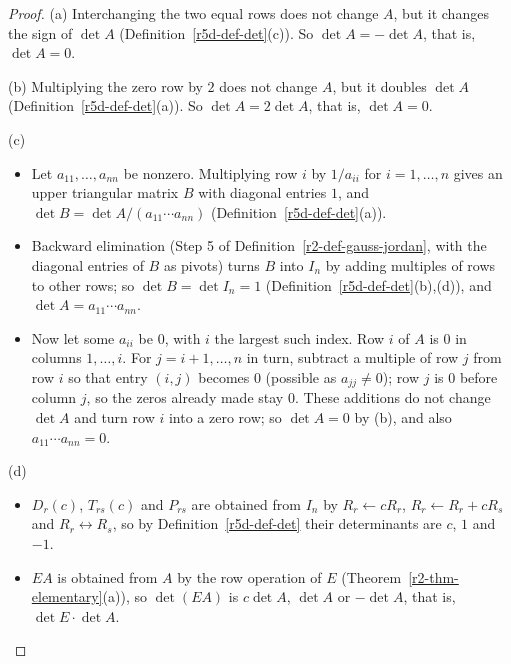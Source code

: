\documentclass[12pt]{article}
\theoremstyle{definition}
\begin{document}
\begin{proof}
(a) Interchanging the two equal rows does not change \(A\), but it changes the sign of \(\det A\)
(Definition~\ref{r5d-def-det}(c)). So \(\det A=-\det A\), that is, \(\det A=0\).

(b) Multiplying the zero row by \(2\) does not change \(A\), but it doubles \(\det A\)
(Definition~\ref{r5d-def-det}(a)). So \(\det A=2\det A\), that is, \(\det A=0\).

(c)
\begin{itemize}
\item Let \(a_{11},\dots,a_{nn}\) be nonzero. Multiplying row \(i\) by \(1/a_{ii}\) for \(i=1,\dots,n\) gives an upper
triangular matrix \(B\) with diagonal entries \(1\), and \(\det B=\det A/(a_{11}\cdots a_{nn})\)
(Definition~\ref{r5d-def-det}(a)).
\item Backward elimination (Step 5 of Definition~\ref{r2-def-gauss-jordan}, with the diagonal entries of \(B\) as
pivots) turns \(B\) into \(I_n\) by adding multiples of rows to other rows; so \(\det B=\det I_n=1\)
(Definition~\ref{r5d-def-det}(b),(d)), and \(\det A=a_{11}\cdots a_{nn}\).
\item Now let some \(a_{ii}\) be \(0\), with \(i\) the largest such index. Row \(i\) of \(A\) is \(0\) in columns
\(1,\dots,i\). For \(j=i+1,\dots,n\) in turn, subtract a multiple of row \(j\) from row \(i\) so that entry
\((i,j)\) becomes \(0\) (possible as \(a_{jj}\ne0\)); row \(j\) is \(0\) before column \(j\), so the zeros already
made stay \(0\). These additions do not change \(\det A\) and turn row \(i\) into a zero row; so \(\det A=0\) by (b),
and also \(a_{11}\cdots a_{nn}=0\).
\end{itemize}

(d)
\begin{itemize}
\item \(D_r(c)\), \(T_{rs}(c)\) and \(P_{rs}\) are obtained from \(I_n\) by \(R_r\leftarrow cR_r\),
\(R_r\leftarrow R_r+cR_s\) and \(R_r\leftrightarrow R_s\), so by Definition~\ref{r5d-def-det} their determinants
are \(c\), \(1\) and \(-1\).
\item \(EA\) is obtained from \(A\) by the row operation of \(E\) (Theorem~\ref{r2-thm-elementary}(a)), so
\(\det(EA)\) is \(c\det A\), \(\det A\) or \(-\det A\), that is, \(\det E\cdot\det A\).\qedhere
\end{itemize}
\end{proof}
\end{document}
